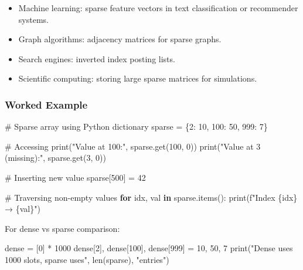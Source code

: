 \documentclass[
  letterpaper,
  DIV=11,
  numbers=noendperiod]{scrreprt}
\newenvironment{Shaded}{\begin{snugshade}}{\end{snugshade}}
\newcommand{\BuiltInTok}[1]{\textcolor[rgb]{0.00,0.23,0.31}{#1}}
\newcommand{\CommentTok}[1]{\textcolor[rgb]{0.37,0.37,0.37}{#1}}
\newcommand{\ControlFlowTok}[1]{\textcolor[rgb]{0.00,0.23,0.31}{\textbf{#1}}}
\newcommand{\DecValTok}[1]{\textcolor[rgb]{0.68,0.00,0.00}{#1}}
\newcommand{\KeywordTok}[1]{\textcolor[rgb]{0.00,0.23,0.31}{\textbf{#1}}}
\newcommand{\NormalTok}[1]{\textcolor[rgb]{0.00,0.23,0.31}{#1}}
\newcommand{\OperatorTok}[1]{\textcolor[rgb]{0.37,0.37,0.37}{#1}}
\newcommand{\SpecialCharTok}[1]{\textcolor[rgb]{0.37,0.37,0.37}{#1}}
\newcommand{\SpecialStringTok}[1]{\textcolor[rgb]{0.13,0.47,0.30}{#1}}
\newcommand{\StringTok}[1]{\textcolor[rgb]{0.13,0.47,0.30}{#1}}
\providecommand{\tightlist}{%
  \setlength{\itemsep}{0pt}\setlength{\parskip}{0pt}}
\begin{document}
\begin{itemize}
\tightlist
\item
  Machine learning: sparse feature vectors in text classification or
  recommender systems.
\item
  Graph algorithms: adjacency matrices for sparse graphs.
\item
  Search engines: inverted index posting lists.
\item
  Scientific computing: storing large sparse matrices for simulations.
\end{itemize}

\subsubsection{Worked Example}\label{worked-example-9}

\begin{Shaded}
\begin{Highlighting}[]
\CommentTok{\# Sparse array using Python dictionary}
\NormalTok{sparse }\OperatorTok{=}\NormalTok{ \{}\DecValTok{2}\NormalTok{: }\DecValTok{10}\NormalTok{, }\DecValTok{100}\NormalTok{: }\DecValTok{50}\NormalTok{, }\DecValTok{999}\NormalTok{: }\DecValTok{7}\NormalTok{\}}

\CommentTok{\# Accessing}
\BuiltInTok{print}\NormalTok{(}\StringTok{"Value at 100:"}\NormalTok{, sparse.get(}\DecValTok{100}\NormalTok{, }\DecValTok{0}\NormalTok{))}
\BuiltInTok{print}\NormalTok{(}\StringTok{"Value at 3 (missing):"}\NormalTok{, sparse.get(}\DecValTok{3}\NormalTok{, }\DecValTok{0}\NormalTok{))}

\CommentTok{\# Inserting new value}
\NormalTok{sparse[}\DecValTok{500}\NormalTok{] }\OperatorTok{=} \DecValTok{42}

\CommentTok{\# Traversing non{-}empty values}
\ControlFlowTok{for}\NormalTok{ idx, val }\KeywordTok{in}\NormalTok{ sparse.items():}
    \BuiltInTok{print}\NormalTok{(}\SpecialStringTok{f"Index }\SpecialCharTok{\{}\NormalTok{idx}\SpecialCharTok{\}}\SpecialStringTok{ → }\SpecialCharTok{\{}\NormalTok{val}\SpecialCharTok{\}}\SpecialStringTok{"}\NormalTok{)}
\end{Highlighting}
\end{Shaded}

For dense vs sparse comparison:

\begin{Shaded}
\begin{Highlighting}[]
\NormalTok{dense }\OperatorTok{=}\NormalTok{ [}\DecValTok{0}\NormalTok{] }\OperatorTok{*} \DecValTok{1000}
\NormalTok{dense[}\DecValTok{2}\NormalTok{], dense[}\DecValTok{100}\NormalTok{], dense[}\DecValTok{999}\NormalTok{] }\OperatorTok{=} \DecValTok{10}\NormalTok{, }\DecValTok{50}\NormalTok{, }\DecValTok{7}
\BuiltInTok{print}\NormalTok{(}\StringTok{"Dense uses 1000 slots, sparse uses"}\NormalTok{, }\BuiltInTok{len}\NormalTok{(sparse), }\StringTok{"entries"}\NormalTok{)}
\end{Highlighting}
\end{Shaded}
\end{document}
